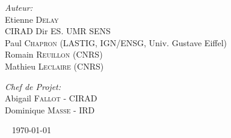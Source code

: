 \begin{titlepage}
\begin{center}
\begin{minipage}{0.4\textwidth}
\begin{flushleft} \large
\emph{\textcolor{gris}{Auteur:}}\\
Etienne \textsc{Delay}\\
\textcolor{vert}{CIRAD Dir ES. UMR SENS}\\
Paul \textsc{Chapron} (LASTIG, IGN/ENSG, Univ. Gustave Eiffel)\\
Romain \textsc{Reuillon} (CNRS)\\
Mathieu \textsc{Leclaire} (CNRS)
\end{flushleft}
\end{minipage}
\begin{minipage}{0.4\textwidth}
\begin{flushright} \large
\emph{\textcolor{gris}{Chef de Projet:}} \\
Abigail \textsc{Fallot} - CIRAD\\
Dominique \textsc{Masse} - IRD
\end{flushright}
\end{minipage}

\vfill

\logoRF ~ \partnerFr
{\large \today}

\end{center}
\end{titlepage}
